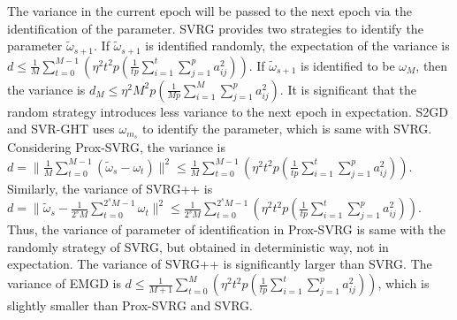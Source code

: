 \documentclass[letterpaper]{article}
\begin{document}
The variance in the current epoch will be passed to the next epoch via the identification of the parameter. SVRG provides two strategies to identify the parameter $ \tilde{\omega}_{s+1}$. If $\tilde{\omega}_{s+1}$ is identified randomly, the expectation of the variance is $d \le \frac{1}{M}\sum_{t=0}^{M-1} \left( \eta^2 t^2p  \left( \frac{1}{tp}\sum\limits_{i=1}^t   \sum\limits_{j=1}^p   a_{ij}^2 \right)\right)$. If $ \tilde{\omega}_{s+1}$ is identified to be $\omega_{M}$,  then the variance is $d_{M}\le \eta^2 M^2p  \left( \frac{1}{Mp}\sum\limits_{i=1}^M   \sum\limits_{j=1}^p   a_{ij}^2 \right)$. It is significant that the random strategy introduces less variance to the next epoch in expectation. S2GD and SVR-GHT uses $\omega_{m_s}$ to identify the parameter, which is same with SVRG. Considering Prox-SVRG, the variance is $d = \parallel  \frac{1}{M} \sum\limits_{t=0}^{M-1}(\tilde{\omega}_s - \omega_t)  \parallel^2  \le \frac{1}{M}\sum\limits_{t=0}^{M-1} \left(  \eta^2 t^2p  \left( \frac{1}{tp}\sum\limits_{i=1}^t   \sum\limits_{j=1}^p   a_{ij}^2 \right)  \right)$. Similarly, the variance of SVRG++ is $d=\parallel  \tilde{\omega}_s - \frac{1}{2^s M}\sum\limits_{t=0}^{2^s M-1} \omega_t  \parallel^2 \le \frac{1}{2^s M}\sum\limits_{t=0}^{2^s M-1} \left(  \eta^2 t^2p  \left( \frac{1}{tp}\sum\limits_{i=1}^t   \sum\limits_{j=1}^p   a_{ij}^2 \right)  \right)$. Thus, the variance of parameter of identification in Prox-SVRG  is same with the randomly strategy of SVRG, but obtained in deterministic way, not in expectation. The variance of SVRG++ is significantly larger than SVRG. The variance of EMGD is $d \le \frac{1}{M+1}\sum\limits_{t=0}^{M} \left(  \eta^2 t^2p  \left( \frac{1}{tp}\sum\limits_{i=1}^t   \sum\limits_{j=1}^p   a_{ij}^2 \right)  \right)$, which is slightly smaller than Prox-SVRG and SVRG.




 
\end{document}
